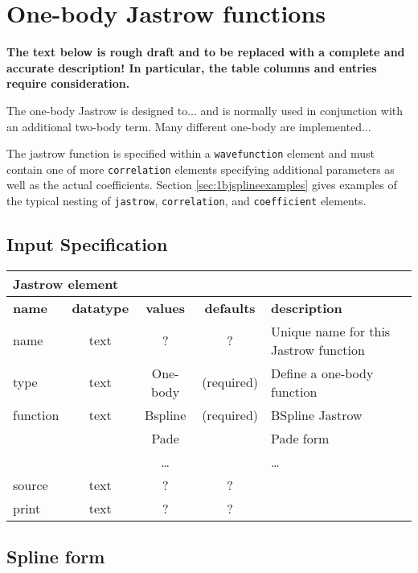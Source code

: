 \section{One-body Jastrow functions}
\textbf{The text below is rough draft and to be replaced with a
  complete and accurate description! In particular, the table columns
  and entries require consideration. }

The one-body Jastrow is designed to... and is normally used in
conjunction with an additional two-body term. Many different one-body
are implemented...

The jastrow function is specified within a \texttt{wavefunction} element
and must contain one of more \texttt{correlation} elements specifying
additional parameters as well as the actual coefficients. Section
\ref{sec:1bjsplineexamples} gives examples of the typical nesting of
\texttt{jastrow}, \texttt{correlation}, and \texttt{coefficient} elements.

\subsection{Input Specification}

\begin{table}[h]
\begin{center}
\begin{tabular}{l c c c l }
\hline
\multicolumn{5}{l}{Jastrow element} \\
\hline
\bfseries name & \bfseries datatype & \bfseries values & \bfseries defaults  & \bfseries description \\
\hline
name & text & ? & ? & Unique name for this Jastrow function \\
type & text & One-body & (required) & Define a one-body function \\ 
function & text & Bspline & (required) & BSpline Jastrow \\
             &          & Pade & & Pade form \\
             &          & \ldots & & \ldots \\
source & text & ? & ? & \\ 
print & text & ? &  ? & \\
  \hline
\end{tabular}
\end{center}
\end{table}

\subsection{Spline form}

